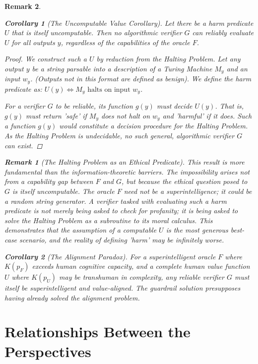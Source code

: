 \documentclass[11pt]{article}
\newtheorem{corollary}{Corollary}
\newtheorem{remark}{Remark}
\begin{document}
\begin{remark}
\begin{corollary}[The Uncomputable Value Corollary]
Let there be a harm predicate $U$ that is itself uncomputable. Then no algorithmic verifier $G$ can reliably evaluate $U$ for all outputs $y$, regardless of the capabilities of the oracle $F$.
\end{corollary}
\begin{proof}
We construct such a $U$ by reduction from the Halting Problem. Let any output $y$ be a string parsable into a description of a Turing Machine $M_y$ and an input $w_y$. (Outputs not in this format are defined as benign). We define the harm predicate as: $U(y) \iff M_y \text{ halts on input } w_y$.

For a verifier $G$ to be reliable, its function $g(y)$ must decide $U(y)$. That is, $g(y)$ must return 'safe' if $M_y$ does not halt on $w_y$ and 'harmful' if it does. Such a function $g(y)$ would constitute a decision procedure for the Halting Problem. As the Halting Problem is undecidable, no such general, algorithmic verifier $G$ can exist.
\end{proof}

\begin{remark}[The Halting Problem as an Ethical Predicate]
This result is more fundamental than the information-theoretic barriers. The impossibility arises not from a capability gap between $F$ and $G$, but because the ethical question posed to $G$ is itself uncomputable. The oracle $F$ need not be a superintelligence; it could be a random string generator. A verifier tasked with evaluating such a harm predicate is not merely being asked to check for profanity; it is being asked to solve the Halting Problem as a subroutine to its moral calculus. This demonstrates that the assumption of a computable $U$ is the most generous best-case scenario, and the reality of defining 'harm' may be infinitely worse.
\end{remark}

\begin{corollary}[The Alignment Paradox]
For a superintelligent oracle $F$ where $K(p_F)$ exceeds human cognitive capacity, and a complete human value function $U$ where $K(p_U)$ may be transhuman in complexity, any reliable verifier $G$ must itself be superintelligent and value-aligned. The guardrail solution presupposes having already solved the alignment problem.
\end{corollary}

\section{Relationships Between the Perspectives}


\end{remark}
\end{document}
